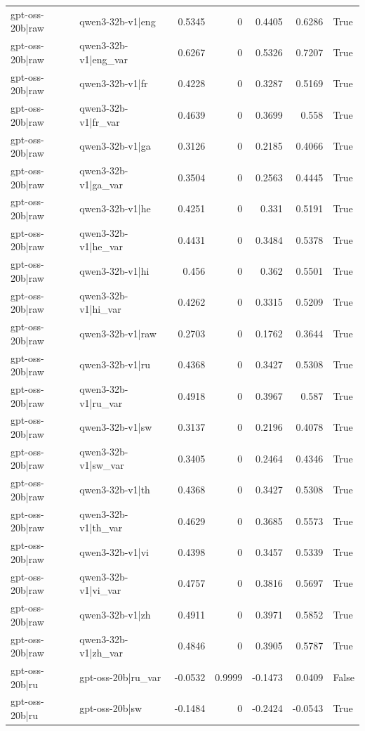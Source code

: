\begin{table}
\begin{tabular}{l l r r r r l}
gpt-oss-20b|raw & qwen3-32b-v1|eng & 0.5345 & 0 & 0.4405 & 0.6286 & True \\
gpt-oss-20b|raw & qwen3-32b-v1|eng_var & 0.6267 & 0 & 0.5326 & 0.7207 & True \\
gpt-oss-20b|raw & qwen3-32b-v1|fr & 0.4228 & 0 & 0.3287 & 0.5169 & True \\
gpt-oss-20b|raw & qwen3-32b-v1|fr_var & 0.4639 & 0 & 0.3699 & 0.558 & True \\
gpt-oss-20b|raw & qwen3-32b-v1|ga & 0.3126 & 0 & 0.2185 & 0.4066 & True \\
gpt-oss-20b|raw & qwen3-32b-v1|ga_var & 0.3504 & 0 & 0.2563 & 0.4445 & True \\
gpt-oss-20b|raw & qwen3-32b-v1|he & 0.4251 & 0 & 0.331 & 0.5191 & True \\
gpt-oss-20b|raw & qwen3-32b-v1|he_var & 0.4431 & 0 & 0.3484 & 0.5378 & True \\
gpt-oss-20b|raw & qwen3-32b-v1|hi & 0.456 & 0 & 0.362 & 0.5501 & True \\
gpt-oss-20b|raw & qwen3-32b-v1|hi_var & 0.4262 & 0 & 0.3315 & 0.5209 & True \\
gpt-oss-20b|raw & qwen3-32b-v1|raw & 0.2703 & 0 & 0.1762 & 0.3644 & True \\
gpt-oss-20b|raw & qwen3-32b-v1|ru & 0.4368 & 0 & 0.3427 & 0.5308 & True \\
gpt-oss-20b|raw & qwen3-32b-v1|ru_var & 0.4918 & 0 & 0.3967 & 0.587 & True \\
gpt-oss-20b|raw & qwen3-32b-v1|sw & 0.3137 & 0 & 0.2196 & 0.4078 & True \\
gpt-oss-20b|raw & qwen3-32b-v1|sw_var & 0.3405 & 0 & 0.2464 & 0.4346 & True \\
gpt-oss-20b|raw & qwen3-32b-v1|th & 0.4368 & 0 & 0.3427 & 0.5308 & True \\
gpt-oss-20b|raw & qwen3-32b-v1|th_var & 0.4629 & 0 & 0.3685 & 0.5573 & True \\
gpt-oss-20b|raw & qwen3-32b-v1|vi & 0.4398 & 0 & 0.3457 & 0.5339 & True \\
gpt-oss-20b|raw & qwen3-32b-v1|vi_var & 0.4757 & 0 & 0.3816 & 0.5697 & True \\
gpt-oss-20b|raw & qwen3-32b-v1|zh & 0.4911 & 0 & 0.3971 & 0.5852 & True \\
gpt-oss-20b|raw & qwen3-32b-v1|zh_var & 0.4846 & 0 & 0.3905 & 0.5787 & True \\
gpt-oss-20b|ru & gpt-oss-20b|ru_var & -0.0532 & 0.9999 & -0.1473 & 0.0409 & False \\
gpt-oss-20b|ru & gpt-oss-20b|sw & -0.1484 & 0 & -0.2424 & -0.0543 & True \\

\end{tabular}
\end{table}
